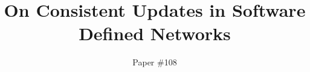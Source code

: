 \documentclass{sig-alternate-10pt-2013}
\title{On Consistent Updates in Software Defined Networks}
\author{
Paper \#108
}
\begin{document}
\maketitle

\newcommand{\paragraphb}[1]{\vspace{0.03in}\noindent{\bf #1} }
\newcommand{\paragraphe}[1]{\vspace{0.03in}\noindent{\em #1} }
\newcommand{\paragraphbe}[1]{\vspace{0.03in}\noindent{\bf \em #1} }

\newcommand{\prooffontsize}{\fontsize{8pt}{9.3pt}\selectfont}
\newcommand{\cready}{\textcolor{black}}
\newcommand{\newcomment}{\textcolor{black}}

\newcommand{\ratul}[1]{{\color{blue}{#1}}}
\newcommand{\roger}[1]{{\color{green}{#1}}}

\newcommand{\swan}{\normalsize S{\small WAN}\xspace}
\newcommand{\swansmall}{\small S{\scriptsize WAN}\xspace}
\newcommand{\cflow}{Vflow\xspace}
\newcommand{\flow}{vflow\xspace}
\newcommand{\flows}{vflows\xspace}

\newcommand{\topolarge}{\textsf{IDN}\xspace}
\newcommand{\toposmall}{\textsf{G-Scale}\xspace}

\newcommand{\corule}{Rule\xspace}
\newcommand{\orule}{rule\xspace}
\newcommand{\orules}{rules\xspace}

\newcommand{\cpr}{Service\xspace}
\newcommand{\pr}{service\xspace}

\newcommand{\cprops}{Service properties\xspace}
\newcommand{\props}{service properties\xspace}

\newcommand{\trurl}{\url{http://somewhere}}

\newcommand{\fixme}[1]{{\bf\textcolor{red}{[#1]}}}

\newcommand{\helpme}[1]{{\bf\textcolor{red}{#1}}}

\newcommand{\figtocapskip}{\vspace{-6pt}}
\newcommand{\figtocapbigskip}{\vspace{-9pt}}
\end{document}
